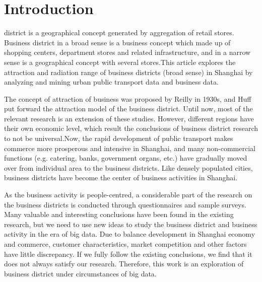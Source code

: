 \documentclass[journal,transmag]{IEEEtran}
\begin{document}
%
\IEEEpeerreviewmaketitle



\section{Introduction}
% 
% 
% 
% 
 district is a geographical concept generated by aggregation of retail stores. Business district in a broad sense is a business concept which made up of shopping centers, department stores and related infrastructure, and in a narrow sense is a geographical concept with several stores.This article explores the attraction and radiation range of business districts (broad sense) in Shanghai by analyzing and mining urban public transport data and business data.

The concept of attraction of business was proposed by Reilly in 1930s, and Huff put forward the attraction model of the business district. Until now, most of the relevant research is an extension of these studies. However, different regions have their own economic level, which result the conclusions of business district research to not be universal.Now, the rapid development of public transport makes commerce more prosperous and intensive in Shanghai, and many non-commercial functions (e.g. catering, banks, government organs, etc.) have gradually moved over from individual area to the business districts. Like densely populated cities, business districts have become the center of business activities in Shanghai.

As the business activity is people-centred, a considerable part of the research on the business districts is conducted through questionnaires and sample surveys. Many valuable and interesting conclusions have been found in the existing research, but we need to use new ideas to study the business district and business activity in the era of big data. Due to balance development in Shanghai economy and commerce, customer characteristics, market competition and other factors have little discrepancy. If we fully follow the existing conclusions, we find that it does not always satisfy our research. Therefore, this work is an exploration of business district under circumstances of big data.
\end{document}
